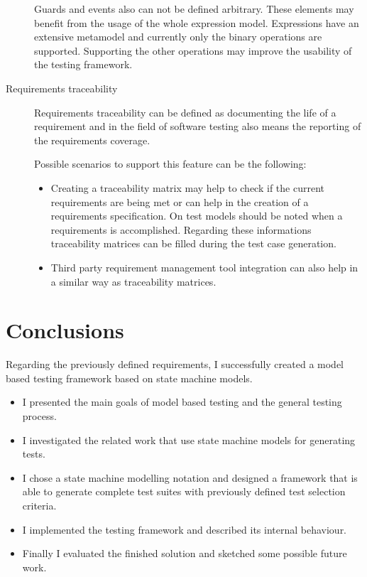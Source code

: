 \begin{description}
	Guards and events also can not be defined arbitrary. These elements may benefit from the usage of the whole expression model. Expressions have an extensive metamodel and currently only the binary operations are supported. Supporting the other operations may improve the usability of the testing framework.
	\item[Requirements traceability] Requirements traceability can be defined as documenting the life of a requirement and in the field of software testing also means the reporting of the requirements coverage.
	
	Possible scenarios to support this feature can be the following:
	
	\begin{itemize}
		\item Creating a traceability matrix may help to check if the current requirements are being met or can help in the creation of a requirements specification. On test models should be noted when a requirements is accomplished. Regarding these informations traceability matrices can be filled during the test case generation.
		\item Third party requirement management tool integration can also help in a similar way as traceability matrices.
	\end{itemize}
\end{description}


\section{Conclusions}
\label{sec:conclusions}

Regarding the previously defined requirements, I successfully created a model based testing framework based on state machine models.

\begin{itemize}
	\item I presented the main goals of model based testing and the general testing process.
	\item I investigated the related work that use state machine models for generating tests.
	\item I chose a state machine modelling notation and designed a framework that is able to generate complete test suites with previously defined test selection criteria.
	\item I implemented the testing framework and described its internal behaviour.
	\item Finally I evaluated the finished solution and sketched some possible future work.
\end{itemize}

